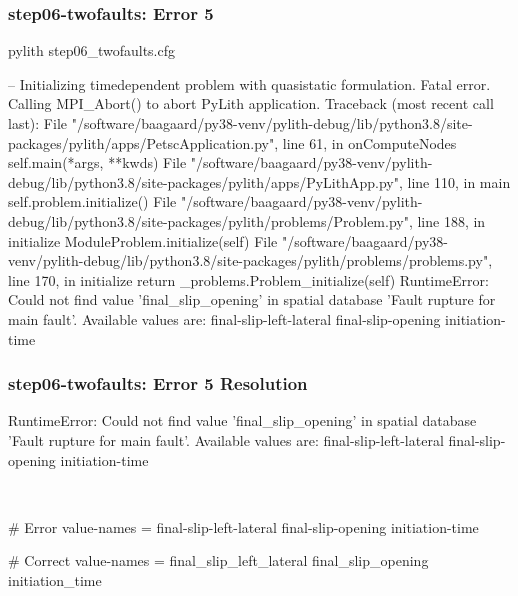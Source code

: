 \documentclass[aspectratio=169]{beamer}
\begin{document}
\begin{frame}[fragile]
  \frametitle{{\ttfamily step06-twofaults}: Error 5}

\begin{bashcode}
pylith step06_twofaults.cfg

 -- Initializing timedependent problem with quasistatic formulation.
Fatal error. Calling MPI_Abort() to abort PyLith application.
Traceback (most recent call last):
  File "/software/baagaard/py38-venv/pylith-debug/lib/python3.8/site-packages/pylith/apps/PetscApplication.py", line 61, in onComputeNodes
    self.main(*args, **kwds)
  File "/software/baagaard/py38-venv/pylith-debug/lib/python3.8/site-packages/pylith/apps/PyLithApp.py", line 110, in main
    self.problem.initialize()
  File "/software/baagaard/py38-venv/pylith-debug/lib/python3.8/site-packages/pylith/problems/Problem.py", line 188, in initialize
    ModuleProblem.initialize(self)
  File "/software/baagaard/py38-venv/pylith-debug/lib/python3.8/site-packages/pylith/problems/problems.py", line 170, in initialize
    return _problems.Problem_initialize(self)
RuntimeError: Could not find value 'final_slip_opening' in spatial database 'Fault rupture for main fault'. Available values are:
  final-slip-left-lateral
  final-slip-opening
  initiation-time
\end{bashcode}

\end{frame}


\begin{frame}[t,fragile]
  \frametitle{{\ttfamily step06-twofaults}: Error 5 Resolution}

  \tserror
  \begin{bashcode}
RuntimeError: Could not find value 'final_slip_opening' in spatial database 'Fault rupture for main fault'. Available values are:
  final-slip-left-lateral
  final-slip-opening
  initiation-time
  \end{bashcode}

  \pause\\[1pt]

  \begin{cfgcode}
    # Error
    value-names = final-slip-left-lateral  final-slip-opening  initiation-time

    # Correct
    value-names = final_slip_left_lateral  final_slip_opening  initiation_time
  \end{cfgcode}

\end{frame}
\end{document}
